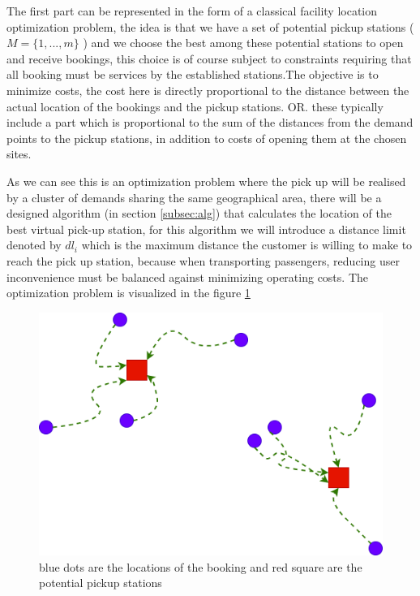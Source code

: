 \documentclass{article}
\begin{document}
The first part can be represented in the form of a classical facility location optimization problem, the idea is that we have a set of potential pickup stations (  $M =  \{ 1, ..., m \}$ ) and we choose the best among these potential stations to open and receive bookings, this choice is of course subject to constraints requiring that all booking must be services by the established stations.The objective is to minimize costs, the cost here is directly proportional to the distance between the actual location of the bookings and the pickup stations. OR. these typically include a part which is proportional to the sum of the distances from the demand points to the pickup stations, in addition to costs of opening them at the chosen sites.

\label{sec:walk_limit}
As we can see this is an optimization problem where the pick up will be realised by a cluster of demands sharing the same geographical area, there will be a designed algorithm (in section \ref{subsec:alg})
that calculates the location of the best virtual pick-up station, for this algorithm we will introduce a distance limit denoted by $dl_i$ which is the maximum distance the customer is willing to make to reach the pick up station,  because when transporting passengers, reducing user inconvenience must be balanced against minimizing operating costs. The optimization problem is visualized in the figure \ref{fig:p-median}

\begin{figure}[H]
    \centering 
  \includegraphics[width=\linewidth]{pictures/pmedian}
  \caption{blue dots are the locations of the booking and red square are the potential pickup stations}
\label{fig:p-median}
\end{figure}
\end{document}
